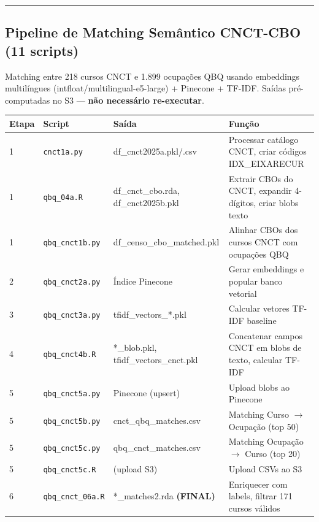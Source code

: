 \documentclass[10pt]{article}
\begin{document}
	\vspace{1em}
	\hrule
	\vspace{1em}
	
	\subsection*{Pipeline de Matching Semântico CNCT-CBO (11 scripts)}
	
	\noindent Matching entre 218 cursos CNCT e 1.899 ocupações QBQ usando embeddings multilíngues (intfloat/multilingual-e5-large) + Pinecone + TF-IDF. Saídas pré-computadas no S3 --- \textbf{não necessário re-executar}.
	
	\begin{center}
		\small
		\begin{tabular}{p{1.5cm}p{4cm}p{4.5cm}p{12cm}}
			\toprule
			\textbf{Etapa} & \textbf{Script} & \textbf{Saída} & \textbf{Função} \\
			\midrule
			1 & \texttt{cnct1a.py} & df\_cnct2025a.pkl/.csv & Processar catálogo CNCT, criar códigos IDX\_EIXARECUR \\
			1 & \texttt{qbq\_04a.R} & df\_cnct\_cbo.rda, df\_cnct2025b.pkl & Extrair CBOs do CNCT, expandir 4-dígitos, criar blobs texto \\
			1 & \texttt{qbq\_cnct1b.py} & df\_censo\_cbo\_matched.pkl & Alinhar CBOs dos cursos CNCT com ocupações QBQ \\
			2 & \texttt{qbq\_cnct2a.py} & Índice Pinecone & Gerar embeddings e popular banco vetorial \\
			3 & \texttt{qbq\_cnct3a.py} & tfidf\_vectors\_*.pkl & Calcular vetores TF-IDF baseline \\
			4 & \texttt{qbq\_cnct4b.R} & *\_blob.pkl, tfidf\_vectors\_cnct.pkl & Concatenar campos CNCT em blobs de texto, calcular TF-IDF \\
			5 & \texttt{qbq\_cnct5a.py} & Pinecone (upsert) & Upload blobs ao Pinecone \\
			5 & \texttt{qbq\_cnct5b.py} & cnct\_qbq\_matches.csv & Matching Curso $\rightarrow$ Ocupação (top 50) \\
			5 & \texttt{qbq\_cnct5c.py} & qbq\_cnct\_matches.csv & Matching Ocupação $\rightarrow$ Curso (top 20) \\
			5 & \texttt{qbq\_cnct5c.R} & (upload S3) & Upload CSVs ao S3 \\
			6 & \texttt{qbq\_cnct\_06a.R} & *\_matches2.rda \textbf{(FINAL)} & Enriquecer com labels, filtrar 171 cursos válidos \\
			\bottomrule
		\end{tabular}
	\end{center}
	
\end{document}
